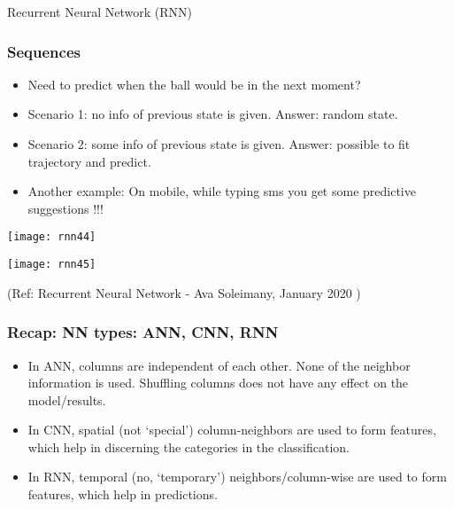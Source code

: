 \begin{frame}
  \begin{center}
    {\Large Recurrent Neural Network (RNN)}
  \end{center}
\end{frame}


\begin{frame}[fragile] \frametitle{Sequences}

\begin{itemize}
\item Need to predict when the ball would be in the next moment?
\item Scenario 1: no info of previous state is given. Answer: random state.
\item Scenario 2: some info of previous state is given. Answer: possible to fit trajectory and predict.
\item Another example: On mobile, while typing sms you get some predictive suggestions !!!
\end{itemize}

\begin{center}
\texttt{[image: rnn44]}

\texttt{[image: rnn45]}

\end{center}

{\tiny (Ref: Recurrent Neural Network - Ava Soleimany, January 2020 )}

\end{frame}


\begin{frame}[fragile] \frametitle{Recap: NN types: ANN, CNN, RNN}

\begin{itemize}
\item In ANN, columns are independent of each other. None of the neighbor information is used. Shuffling columns does not have any effect on the model/results.
\item In CNN, spatial (not `special') column-neighbors are used to form features, which help in discerning the categories in the classification.
\item In RNN, temporal (no, `temporary') neighbors/column-wise are used to form features, which help in predictions.
\end{itemize}

\end{frame}



